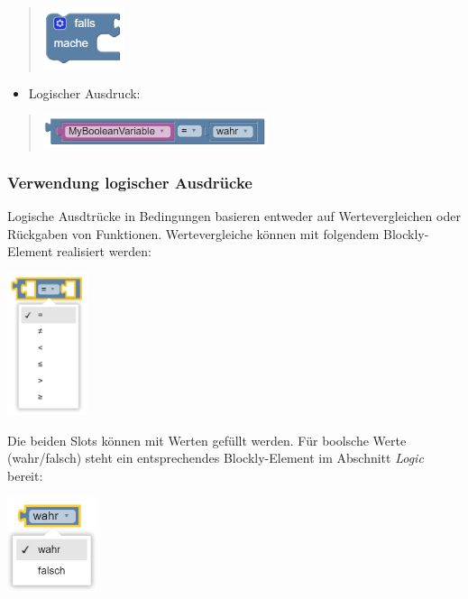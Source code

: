 \documentclass[
  letterpaper,
  DIV=11]{scrreprt}
\providecommand{\tightlist}{%
  \setlength{\itemsep}{0pt}\setlength{\parskip}{0pt}}\usepackage{longtable,booktabs,array}
\begin{document}
\begin{tcolorbox}
\begin{quote}
\includegraphics[width=0.9375in,height=\textheight]{img/screenshot-blockly-element-if-then-separat-01-DEU.png}
\end{quote}

\begin{itemize}
\tightlist
\item
  Logischer Ausdruck:
\end{itemize}

\begin{quote}
\includegraphics[width=2.60417in,height=\textheight]{img/screenshot-blockly-condition-separat-01-DEU.png}
\end{quote}

\hypertarget{verwendung-logischer-ausdruxfccke-1}{%
\subsubsection{Verwendung logischer
Ausdrücke}\label{verwendung-logischer-ausdruxfccke-1}}

Logische Ausdtrücke in Bedingungen basieren entweder auf
Wertevergleichen oder Rückgaben von Funktionen. Wertevergleiche können
mit folgendem Blockly-Element realisiert werden:

\includegraphics[width=0.9375in,height=\textheight]{img/screenshot-routing-block-value-comparison-empty.png}

Die beiden Slots können mit Werten gefüllt werden. Für boolsche Werte
(wahr/falsch) steht ein entsprechendes Blockly-Element im Abschnitt
\emph{Logic} bereit:

\includegraphics[width=1.04167in,height=\textheight]{img/screenshot-routing-block-bool-value-DEU.png}


\end{tcolorbox}
\end{document}
